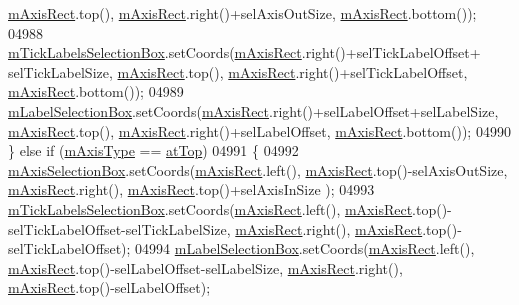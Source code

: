 \begin{DoxyCode}
      \hyperlink{a00025_ad63d51f30f835f3a568b6231362ed4a0}{mAxisRect}.top(), \hyperlink{a00025_ad63d51f30f835f3a568b6231362ed4a0}{mAxisRect}.right()+selAxisOutSize, \hyperlink{a00025_ad63d51f30f835f3a568b6231362ed4a0}{mAxisRect}.bottom());
04988     \hyperlink{a00025_acca7a38191c1f4df06b9416d43172214}{mTickLabelsSelectionBox}.setCoords(\hyperlink{a00025_ad63d51f30f835f3a568b6231362ed4a0}{mAxisRect}.right()+selTickLabelOffset+
      selTickLabelSize, \hyperlink{a00025_ad63d51f30f835f3a568b6231362ed4a0}{mAxisRect}.top(), \hyperlink{a00025_ad63d51f30f835f3a568b6231362ed4a0}{mAxisRect}.right()+selTickLabelOffset, 
      \hyperlink{a00025_ad63d51f30f835f3a568b6231362ed4a0}{mAxisRect}.bottom());
04989     \hyperlink{a00025_a14fbf65daf2c38cbb0f2c4278a7929dd}{mLabelSelectionBox}.setCoords(\hyperlink{a00025_ad63d51f30f835f3a568b6231362ed4a0}{mAxisRect}.right()+selLabelOffset+selLabelSize, 
      \hyperlink{a00025_ad63d51f30f835f3a568b6231362ed4a0}{mAxisRect}.top(), \hyperlink{a00025_ad63d51f30f835f3a568b6231362ed4a0}{mAxisRect}.right()+selLabelOffset, \hyperlink{a00025_ad63d51f30f835f3a568b6231362ed4a0}{mAxisRect}.bottom());
04990   \} \textcolor{keywordflow}{else} \textcolor{keywordflow}{if} (\hyperlink{a00025_ae704bf9f2c2b026f08dd4ccad79c616e}{mAxisType} == \hyperlink{a00025_ae2bcc1728b382f10f064612b368bc18aac0ece2b680d3f545e701f75af1655977}{atTop})
04991   \{
04992     \hyperlink{a00025_a6185814615059cacf09fdb74a3e539d7}{mAxisSelectionBox}.setCoords(\hyperlink{a00025_ad63d51f30f835f3a568b6231362ed4a0}{mAxisRect}.left(), 
      \hyperlink{a00025_ad63d51f30f835f3a568b6231362ed4a0}{mAxisRect}.top()-selAxisOutSize, \hyperlink{a00025_ad63d51f30f835f3a568b6231362ed4a0}{mAxisRect}.right(), \hyperlink{a00025_ad63d51f30f835f3a568b6231362ed4a0}{mAxisRect}.top()+selAxisInSize
      );
04993     \hyperlink{a00025_acca7a38191c1f4df06b9416d43172214}{mTickLabelsSelectionBox}.setCoords(\hyperlink{a00025_ad63d51f30f835f3a568b6231362ed4a0}{mAxisRect}.left(), 
      \hyperlink{a00025_ad63d51f30f835f3a568b6231362ed4a0}{mAxisRect}.top()-selTickLabelOffset-selTickLabelSize, \hyperlink{a00025_ad63d51f30f835f3a568b6231362ed4a0}{mAxisRect}.right(), 
      \hyperlink{a00025_ad63d51f30f835f3a568b6231362ed4a0}{mAxisRect}.top()-selTickLabelOffset);
04994     \hyperlink{a00025_a14fbf65daf2c38cbb0f2c4278a7929dd}{mLabelSelectionBox}.setCoords(\hyperlink{a00025_ad63d51f30f835f3a568b6231362ed4a0}{mAxisRect}.left(), 
      \hyperlink{a00025_ad63d51f30f835f3a568b6231362ed4a0}{mAxisRect}.top()-selLabelOffset-selLabelSize, \hyperlink{a00025_ad63d51f30f835f3a568b6231362ed4a0}{mAxisRect}.right(), 
      \hyperlink{a00025_ad63d51f30f835f3a568b6231362ed4a0}{mAxisRect}.top()-selLabelOffset);

\end{DoxyCode}
